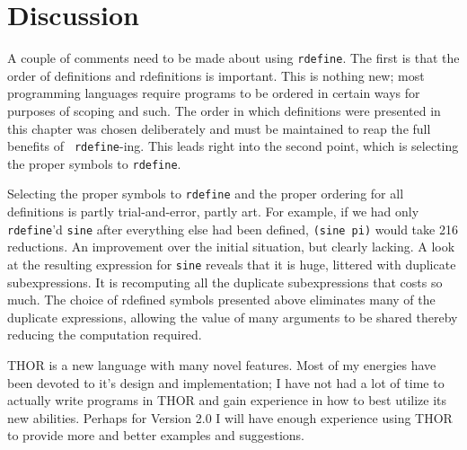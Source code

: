 \section{Discussion}

	A couple of comments need to be made about using {\tt rdefine}.  The
first is that the order of definitions and rdefinitions is important. 
This is nothing new; most programming languages require programs to be
ordered in certain ways for purposes of scoping and such.  
The order in which definitions were presented in this chapter was chosen
deliberately and must be maintained to reap the full benefits of {\tt
rdefine}-ing.   This leads right into the second point, which is
selecting the proper symbols to {\tt rdefine}.

	Selecting the proper symbols to {\tt rdefine} and the
proper ordering for all definitions is partly trial-and-error, partly
art.  For example, if we had
only {\tt rdefine}'d {\tt sine} after everything else had been defined,
{\tt (sine pi)} would take 216 reductions.  An improvement over the
initial situation, but clearly lacking.  A look at the resulting
expression for {\tt sine} reveals that it is huge, littered with
duplicate subexpressions.  It is recomputing all the duplicate subexpressions
that costs so much.  The choice of rdefined symbols presented
above eliminates many of the duplicate expressions, allowing the value
of many arguments to be shared thereby reducing the computation required.

	THOR is a new language with many novel features.  Most of my
energies have been devoted to it's design and implementation;  I have
not had a lot of time to actually write programs in THOR and gain
experience in how to best utilize its new abilities.
Perhaps for Version 2.0 I will have enough experience using THOR to
provide more and better examples and suggestions.


